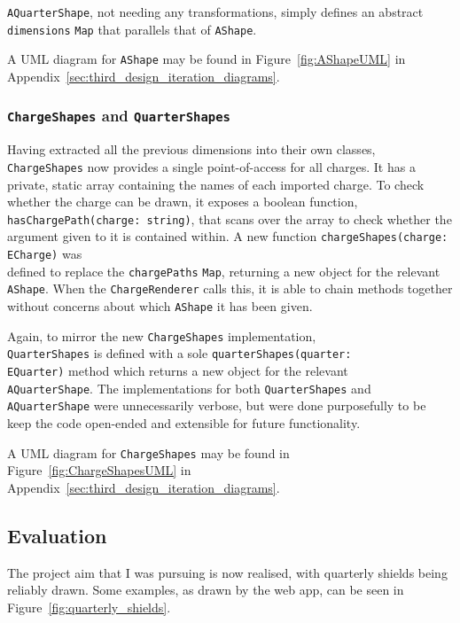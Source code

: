 \documentclass[nobib, a4paper, twoside, justified]{tufte-book}
\makeatletter
\newcommand{\charge}{\gls{charge}\@\xspace}
\newcommand{\charges}{\glspl{charge}\@\xspace}
\makeatother
\begin{document}
\texttt{AQuarterShape}, not needing any transformations, simply defines an abstract
\texttt{dimensions} \texttt{Map} that parallels that of \texttt{AShape}.

A UML diagram for \texttt{AShape} may be found in Figure~\ref{fig:AShapeUML} in
Appendix~\ref{sec:third_design_iteration_diagrams}.

\subsubsection{\texttt{ChargeShapes} and \texttt{QuarterShapes}}%
\label{ssub:chargeshapes_and_quartershapes}

Having extracted all the previous dimensions into their own classes, \texttt{ChargeShapes} now
provides a single point-of-access for all \charges. It has a private, static array containing the
names of each imported \charge. To check whether the \charge can be drawn, it exposes a boolean
function, \texttt{hasChargePath(charge: string)}, that scans over the array to check whether the
argument given to it is contained within. A new function \texttt{chargeShapes(charge: ECharge)} was
\\ defined to replace the \texttt{chargePaths} \texttt{Map}, returning a new object for the
relevant \texttt{AShape}. When the \texttt{ChargeRenderer} calls this, it is able to chain methods
together without concerns about which \texttt{AShape} it has been given.

Again, to mirror the new \texttt{ChargeShapes} implementation, \\ \texttt{QuarterShapes} is defined
with a sole \texttt{quarterShapes(quarter:\\ EQuarter)} method which returns a new object for the
relevant\\ \texttt{AQuarterShape}. The implementations for both \texttt{QuarterShapes} and
\texttt{AQuarterShape} were unnecessarily verbose, but were done purposefully to be keep the code
open-ended and extensible for future functionality.

A UML diagram for \texttt{ChargeShapes} may be found in Figure~\ref{fig:ChargeShapesUML} in
Appendix~\ref{sec:third_design_iteration_diagrams}.

\subsection{Evaluation}%
\label{sub:third_design_evaluation}

The project aim that I was pursuing is now realised, with quarterly shields being reliably drawn.
Some examples, as drawn by the web app, can be seen in Figure~\ref{fig:quarterly_shields}.
\end{document}
